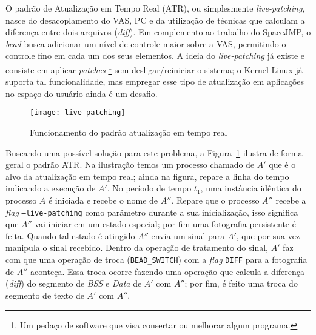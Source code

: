 O padrão de Atualização em Tempo Real (ATR), ou simplesmente
\emph{live-patching}, nasce do desacoplamento do VAS, PC e da utilização de
técnicas que calculam a diferença entre dois arquivos (\emph{diff}). Em
complemento ao trabalho do SpaceJMP, o \emph{bead} busca adicionar um nível de
controle maior sobre a VAS, permitindo o controle fino em cada um dos seus
elementos. A ideia do \emph{live-patching} já existe e consiste em aplicar
\emph{patches} \footnote{Um pedaço de software que visa consertar ou melhorar
algum programa.} sem desligar/reiniciar o sistema; o Kernel Linux já suporta
tal funcionalidade, mas empregar esse tipo de atualização em aplicações no
espaço do usuário ainda é um desafio.

\begin{figure}[!h]
  \centering
  \texttt{[image: live-patching]}
  \caption{Funcionamento do padrão atualização em tempo real}
  \label{fig:atr}
\end{figure}

Buscando uma possível solução para este problema, a Figura~\ref{fig:atr}
ilustra de forma geral o padrão ATR. Na ilustração temos um processo chamado de
$A'$ que é o alvo da atualização em tempo real; ainda na figura, repare a linha
do tempo indicando a execução de $A'$. No período de tempo $t_1$, uma instância
idêntica do processo $A$ é iniciada e recebe o nome de $A''$.  Repare que o
processo $A''$ recebe a \emph{flag} \texttt{--live-patching} como parâmetro
durante a sua inicialização, isso significa que $A''$ vai iniciar em um estado
especial; por fim uma fotografia persistente é feita. Quando tal estado é
atingido $A''$ envia um sinal para $A'$, que por sua vez manipula o sinal
recebido.  Dentro da operação de tratamento do sinal, $A'$ faz com que uma
operação de troca (\texttt{BEAD\_SWITCH}) com a \emph{flag} \texttt{DIFF} para
a fotografia de $A''$ aconteça. Essa troca ocorre fazendo uma operação que
calcula a diferença (\emph{diff}) do segmento de \emph{BSS} e \emph{Data} de
$A'$ com $A''$; por fim, é feito uma troca do segmento de texto de $A'$ com
$A''$.



